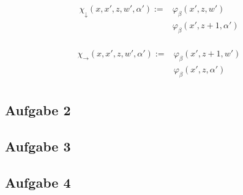 \documentclass[12pt]{article}
\begin{document}
\begin{align*}
  \chi_{\downarrow}(x,x',z,w',\alpha') := &\varphi_\beta(x', z, w') \\
  &\varphi_\beta(x',z+1,\alpha') \\
\end{align*}

\begin{align*}
  \chi_{\rightarrow}(x,x',z,w',\alpha') := &\varphi_\beta(x', z+1, w') \\
  &\varphi_\beta(x',z,\alpha') \\
\end{align*}
\subsection*{Aufgabe 2}
\subsection*{Aufgabe 3}
\subsection*{Aufgabe 4}
\end{document}
